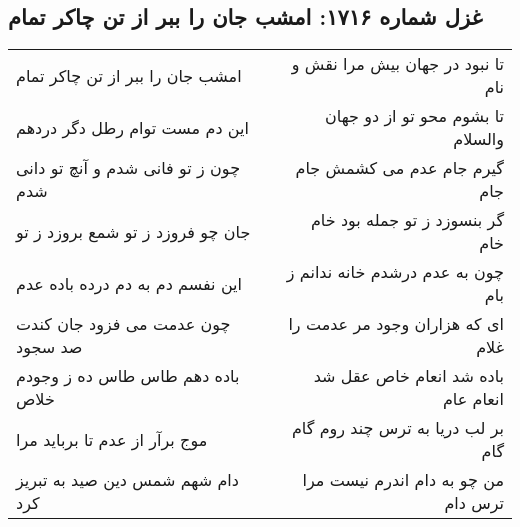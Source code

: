 \begin{center}
\section*{غزل شماره ۱۷۱۶: امشب جان را ببر از تن چاکر تمام}
\label{sec:1716}
\begin{longtable}{l p{0.5cm} r}
امشب جان را ببر از تن چاکر تمام
&&
تا نبود در جهان بیش مرا نقش و نام
\\
این دم مست توام رطل دگر دردهم
&&
تا بشوم محو تو از دو جهان والسلام
\\
چون ز تو فانی شدم و آنچ تو دانی شدم
&&
گیرم جام عدم می کشمش جام جام
\\
جان چو فروزد ز تو شمع بروزد ز تو
&&
گر بنسوزد ز تو جمله بود خام خام
\\
این نفسم دم به دم درده باده عدم
&&
چون به عدم درشدم خانه ندانم ز بام
\\
چون عدمت می فزود جان کندت صد سجود
&&
ای که هزاران وجود مر عدمت را غلام
\\
باده دهم طاس طاس ده ز وجودم خلاص
&&
باده شد انعام خاص عقل شد انعام عام
\\
موج برآر از عدم تا برباید مرا
&&
بر لب دریا به ترس چند روم گام گام
\\
دام شهم شمس دین صید به تبریز کرد
&&
من چو به دام اندرم نیست مرا ترس دام
\\
\end{longtable}
\end{center}
